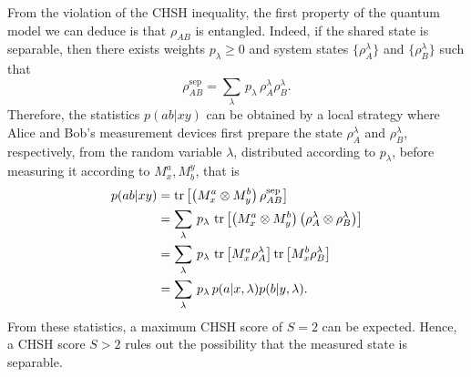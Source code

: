 From the violation of the CHSH inequality, the first property of the quantum model we can deduce is that $\rho_{AB}$ is entangled.
Indeed, if the shared state is separable, then there exists weights $p_\lambda\geq 0$ and system states $\{\rho_{A}^\lambda\}$ and $\{\rho_{B}^\lambda\}$ such that
\begin{equation}
	\rho_{AB}^\text{sep} = \sum_\lambda\, p_\lambda\, \rho_{A}^\lambda \rho_B^\lambda.
\end{equation}
Therefore, the statistics $p(ab|xy)$ can be obtained by a local strategy where Alice and Bob's measurement devices first prepare the state $\rho_A^\lambda$ and $\rho_B^\lambda$, respectively, from the random variable $\lambda$, distributed according to $p_\lambda$, before measuring it according to $M^a_x,M_b^y$, that is
\begin{equation}
	\begin{split}
		p(ab|xy) &= \trr{\left(M^a_x \otimes M^b_y \right) \rho_{AB}^\text{sep}}  \\
				 & = \sum_\lambda\, p_\lambda \, \trr{\left(M^a_x \otimes M^b_y \right)\left(\rho_{A}^\lambda \otimes \rho_B^\lambda\right)} \\
				 & = \sum_\lambda\, p_\lambda\, \trr{M^a_x \rho_A^\lambda} \trr{M^b_x \rho_B^\lambda} \\
				 & = \sum_\lambda\, p_\lambda\, p(a|x,\lambda) p(b|y,\lambda).
	\end{split}
\end{equation}
From these statistics, a maximum CHSH score of $S=2$ can be expected.
Hence, a CHSH score $S>2$ rules out the possibility that the measured state is separable.

\medbreak

